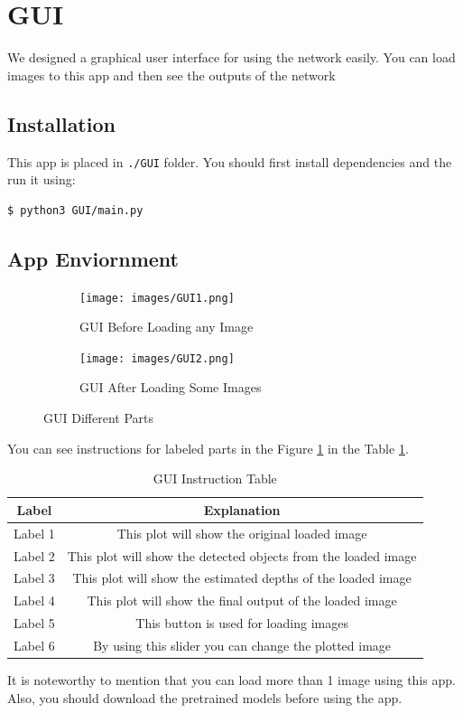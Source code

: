 \documentclass[a4paper, openany]{book}
\newcommand{\code}{\texttt}
\begin{document}
\newpage

\section{GUI}
	\vspace{0.3cm}
	
We designed a graphical user interface for using the network easily. You can load images to this app and then see the outputs of the network

\subsection{Installation}
	\vspace{0.3cm}
This app is placed in \code{./GUI} folder. You should first install dependencies and the run it using:
\begin{lstlisting}[language=bash]
  $ python3 GUI/main.py
  \end{lstlisting}
  
  \subsection{App Enviornment}
	\vspace{0.3cm}
  
  
  \begin{figure}[ht]
  \centering
    \begin{subfigure}[b]{0.6\linewidth}
    \texttt{[image: images/GUI1.png]}
    \caption{GUI Before Loading any Image}
  \end{subfigure}
  \begin{subfigure}[b]{0.6\linewidth}
    \texttt{[image: images/GUI2.png]}
    \caption{GUI After Loading Some Images}
  \end{subfigure}
  
      \caption{GUI Different Parts}
  \label{fig:GUI1}
\end{figure}
  

You can see instructions for labeled parts in the Figure \ref{fig:GUI1} in the Table \ref{table:GUI1}.

\newpage

\begin{table}[htp]
\caption{GUI Instruction Table}
\begin{center}
\begin{tabular}{c | c }
Label &Explanation \\
\hline
Label 1 & This plot will show the original loaded image \\
Label 2 & This plot will show the detected objects from the loaded image \\
Label 3 & This plot will show the estimated depths of the loaded image \\
Label 4 & This plot will show the final output of the loaded image \\
Label 5 & This button is used for loading images\\
Label 6 & By using this slider you can change the plotted image \\
\end{tabular}
\end{center}
\label{table:GUI1}
\end{table}%

It is noteworthy to mention that you can load more than 1 image using this app. Also, you should download the pretrained models before using the app. 
 
\end{document}
